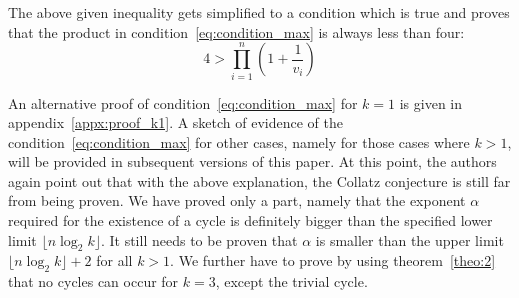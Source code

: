 The above given inequality gets simplified to a condition which is true and proves that the product in condition~\ref{eq:condition_max} is always less than four:
\[
4>\prod_{i=1}^{n}\left(1+\frac{1}{v_{i}}\right)
\]

\par
An alternative proof of condition~\ref{eq:condition_max} for $k=1$ is given in appendix~\ref{appx:proof_k1}. A sketch of evidence of the condition~\ref{eq:condition_max} for other cases, namely for those cases where $k>1$, will be provided in subsequent versions of this paper. At this point, the authors again point out that with the above explanation, the Collatz conjecture is still far from being proven. We have proved only a part, namely that the exponent $\alpha$ required for the existence of a cycle is definitely bigger than the specified lower limit $\lfloor n\log_2k\rfloor$. It still needs to be proven that $\alpha$ is smaller than the upper limit $\lfloor n\log_2k\rfloor+2$ for all $k>1$. We further have to prove by using theorem~\ref{theo:2} that no cycles can occur for $k=3$, except the trivial cycle.






